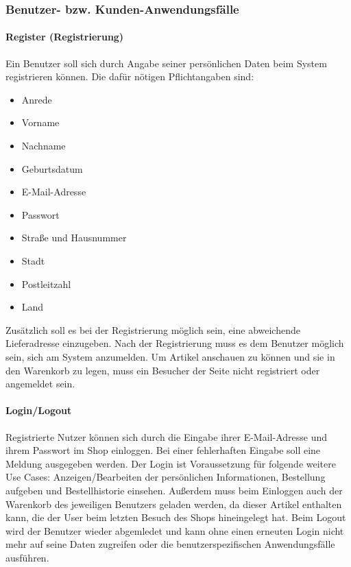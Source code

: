 \subsubsection{Benutzer- bzw. Kunden-Anwendungsfälle}
\paragraph{Register (Registrierung)}$\;$ \\
Ein Benutzer soll sich durch Angabe seiner persönlichen Daten beim System registrieren können.
Die dafür nötigen Pflichtangaben sind:
\begin{itemize}
\item Anrede
\item Vorname
\item Nachname
\item Geburtsdatum
\item E-Mail-Adresse
\item Passwort
\item Straße und Hausnummer
\item Stadt
\item Postleitzahl
\item Land
\end{itemize}
Zusätzlich soll es bei der Registrierung möglich sein, eine abweichende Lieferadresse einzugeben.
Nach der Registrierung muss es dem Benutzer möglich sein, sich am System anzumelden.
Um Artikel anschauen zu können und sie in den Warenkorb zu legen, muss ein Besucher der Seite nicht registriert oder angemeldet sein.

\paragraph{Login/Logout}$\;$ \\
Registrierte Nutzer können sich durch die Eingabe ihrer E-Mail-Adresse und ihrem Passwort im Shop einloggen.
Bei einer fehlerhaften Eingabe soll eine Meldung ausgegeben werden.
Der Login ist Voraussetzung für folgende weitere Use Cases: Anzeigen/Bearbeiten der persönlichen Informationen, Bestellung aufgeben und Bestellhistorie einsehen.
Außerdem muss beim Einloggen auch der Warenkorb des jeweiligen Benutzers geladen werden, da dieser Artikel enthalten kann, die der User beim letzten Besuch des Shops hineingelegt hat.
Beim Logout wird der Benutzer wieder abgemledet und kann ohne einen erneuten Login nicht mehr auf seine Daten zugreifen oder die benutzerspezifischen Anwendungsfälle ausführen.

